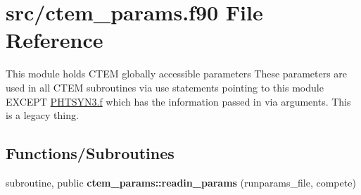 \hypertarget{ctem__params_8f90}{}\section{src/ctem\+\_\+params.f90 File Reference}
\label{ctem__params_8f90}


This module holds C\+T\+E\+M globally accessible parameters These parameters are used in all C\+T\+E\+M subroutines via use statements pointing to this module E\+X\+C\+E\+P\+T \hyperlink{PHTSYN3_8f}{P\+H\+T\+S\+Y\+N3.\+f} which has the information passed in via arguments. This is a legacy thing.  


\subsection*{Functions/\+Subroutines}
{\bf }\par
\begin{DoxyCompactItemize}
\item 
subroutine, public {\bfseries ctem\+\_\+params\+::readin\+\_\+params} (runparams\+\_\+file, compete)
\end{DoxyCompactItemize}

